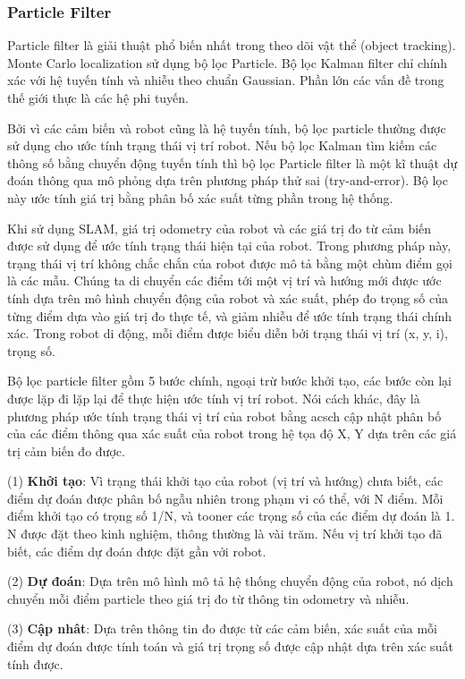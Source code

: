 \subsubsection*{Particle Filter}
Particle filter là giải thuật phổ biến nhất trong theo dõi vật thể (object tracking). Monte Carlo localization sử dụng bộ lọc Particle. Bộ lọc Kalman filter chỉ chính xác với hệ tuyến tính và nhiễu theo chuẩn Gaussian. Phần lớn các vấn đề trong thế giới thực là các hệ phi tuyến.

Bởi vì các cảm biến và robot cũng là hệ tuyến tính, bộ lọc particle thường được sử dụng cho ước tính trạng thái vị trí robot. Nếu bộ lọc Kalman tìm kiếm các thông số bằng chuyển động tuyến tính thì bộ lọc Particle filter là một kĩ thuật dự đoán thông qua mô phỏng dựa trên phương pháp thử sai (try-and-error). Bộ lọc này ước tính giá trị bằng phân bố xác suất từng phần trong hệ thống.

Khi sử dụng SLAM, giá trị odometry của robot và các giá trị đo từ cảm biến được sử dụng để ước tính trạng thái hiện tại của robot. Trong phương pháp này, trạng thái vị trí không chắc chắn của robot được mô tả bằng một chùm điểm gọi là các mẫu. Chúng ta di chuyển các điểm tới một vị trí và hướng mới được ước tính dựa trên mô hình chuyển động của robot và xác suất, phép đo trọng số của từng điểm dựa vào giá trị đo thực tế, và giảm nhiễu để ước tính trạng thái chính xác. Trong robot di động, mỗi điểm được biểu diễn bởi trạng thái vị trí (x, y, i), trọng số.

Bộ lọc particle filter gồm 5 bước chính, ngoại trừ bước khởi tạo, các bước còn lại được lặp đi lặp lại để thực hiện ước tính vị trí robot. Nói cách khác, đây là phương pháp ước tính trạng thái vị trí của robot bằng acsch cập nhật phân bố của các điểm thông qua xác suất của robot trong hệ tọa độ X, Y dựa trên các giá trị cảm biến đo được.

(1) \textbf{Khởi tạo}:
Vì trạng thái khởi tạo của robot (vị trí và hướng) chưa biết, các điểm dự đoán được phân bố ngẫu nhiên trong phạm vi có thể, với N điểm. Mỗi điểm khởi tạo có trọng số 1/N, và tooner các trọng số của các điểm dự đoán là 1. N được đặt theo kinh nghiệm, thông thường là vài trăm. Nếu vị trí khởi tạo đã biết, các điểm dự đoán được đặt gần vởi robot.

(2) \textbf{Dự đoán}: Dựa trên mô hình mô tả hệ thống chuyển động của robot, nó dịch chuyển mỗi điểm particle theo giá trị đo từ thông tin odometry và nhiễu.

(3) \textbf{Cập nhât}: Dựa trên thông tin đo được từ các cảm biến, xác suất của mỗi điểm dự đoán được tính toán và giá trị trọng số được cập nhật dựa trên xác suất tính được.

